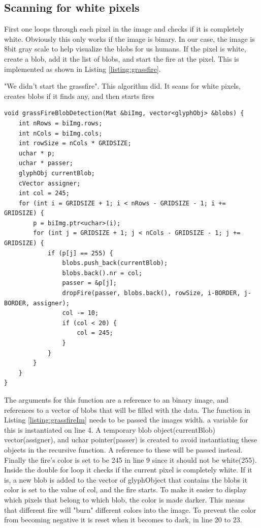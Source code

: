 \subsection{Scanning for white pixels}
First one loops through each pixel in the image and checks if it is completely white. Obviously this only works if the image is binary. In our case, the image is 8bit gray scale to help visualize the blobs for us humans. If the pixel is white, create a blob, add it the list of blobs, and start the fire at the pixel. This is implemented as shown in Listing \autoref{listing:grassfire}.
\begin{listing}[H]
	\caption{"We didn't start the grassfire". This algorithm did. It scans for white pixels, creates blobs if it finds any, and then starts fires}
	\begin{verbatim}
void grassFireBlobDetection(Mat &biImg, vector<glyphObj> &blobs) {
	int nRows = biImg.rows;
	int nCols = biImg.cols;
	int rowSize = nCols * GRIDSIZE;
	uchar * p;
	uchar * passer;
	glyphObj currentBlob;
	cVector assigner;
	int col = 245;
	for (int i = GRIDSIZE + 1; i < nRows - GRIDSIZE - 1; i += GRIDSIZE) {
		p = biImg.ptr<uchar>(i);
		for (int j = GRIDSIZE + 1; j < nCols - GRIDSIZE - 1; j += GRIDSIZE) {
			if (p[j] == 255) {
				blobs.push_back(currentBlob);
				blobs.back().nr = col;
				passer = &p[j];
				dropFire(passer, blobs.back(), rowSize, i-BORDER, j-BORDER, assigner);
				col -= 10;
				if (col < 20) {
					col = 245;
				}
			}
		}
	}
}
	\end{verbatim}
	\label{listing:grassfire}
\end{listing}
The arguments for this function are a reference to an binary image, and references to a vector of blobs that will be filled with the data. The  function in Listing \ref{listing:grassfireIm} needs to be passed the images width. a variable for this is instantiated on line 4. A temporary blob object(currentBlob) vector(assigner), and uchar pointer(passer) is created to avoid instantiating these objects in the recursive function. A reference to these will be passed instead. Finally the fire's color is set to be 245 in line 9 since it should not be white(255). Inside the double for loop it checks if the current pixel is completely white. If it is, a new blob is added to the vector of glyphObject that contains the blobs it color is set to the value of col, and the fire starts. To make it easier to display which pixels that belong to which blob, the color is made darker. This means that different fire will "burn" different colors into the image. To prevent the color from becoming negative it is reset when it becomes to dark, in line 20 to 23.\\
